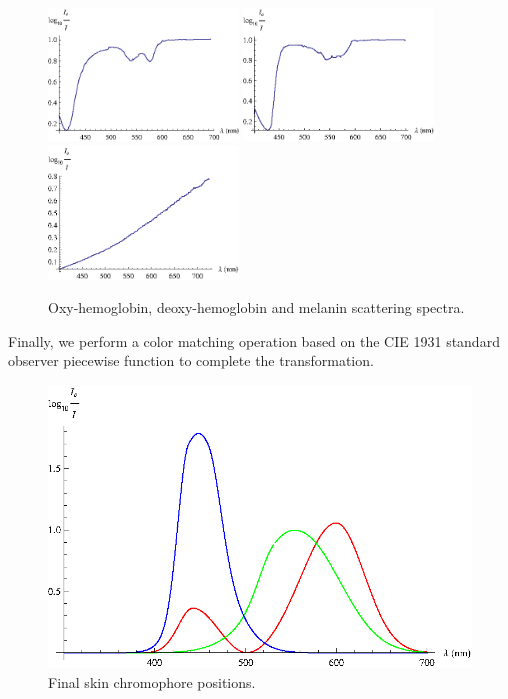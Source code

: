 \begin{figure}[h!]
  \centering
    \includegraphics[width=0.45\textwidth]{Chapter2/Figs/scatOxyHemo.eps}
    \includegraphics[width=0.45\textwidth]{Chapter2/Figs/scatDeoxyHemo.eps}
    \includegraphics[width=0.45\textwidth]{Chapter2/Figs/scatMelanin.eps}
    \caption{Oxy-hemoglobin, deoxy-hemoglobin and melanin scattering spectra.}  \label{fig:scat}
\end{figure}

Finally, we perform a color matching operation based on the CIE 1931 standard observer piecewise function to complete the transformation.

\begin{figure}[h!]
  \centering
    \includegraphics[width=\textwidth]{Chapter2/Figs/colorBasis.eps}
    \caption{Final skin chromophore positions.}  \label{fig:colorBasis}
\end{figure}

